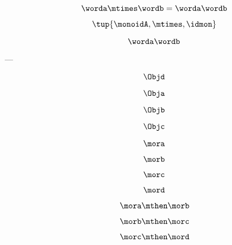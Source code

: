 {\begin{forslides}
		\begin{equation*}
			\label{eq:string-semigroup-wordab-2}
			\worda \mtimes  \wordb =  \worda \wordb
		\end{equation*}

		$$ \tup{ \monoidA, \mtimes, \idmon} $$

		\begin{equation*}
			\label{eq:string-semigroup-wordab-concat-2}
			\worda \wordb
		\end{equation*}

		---

		\begin{equation}
			\label{eq:00}
			\Objd
		\end{equation}

		\begin{equation}
			\label{eq:01}
			\Obja
		\end{equation}

		\begin{equation}
			\label{eq:02}
			\Objb
		\end{equation}

		\begin{equation}
			\label{eq:03}
			\Objc
		\end{equation}

		\begin{equation}
			\label{eq:04}
			\mora
		\end{equation}

		\begin{equation}
			\label{eq:05}
			\morb
		\end{equation}

		\begin{equation}
			\label{eq:06}
			\morc
		\end{equation}

		\begin{equation}
			\label{eq:07}
			\mord
		\end{equation}

		\begin{equation}
			\label{eq:08}
			\mora \mthen \morb
		\end{equation}

		\begin{equation}
			\label{eq:09}
			\morb \mthen \morc
		\end{equation}

		\begin{equation}
			\label{eq:10}
			\morc \mthen \mord
		\end{equation}


\end{forslides}}
